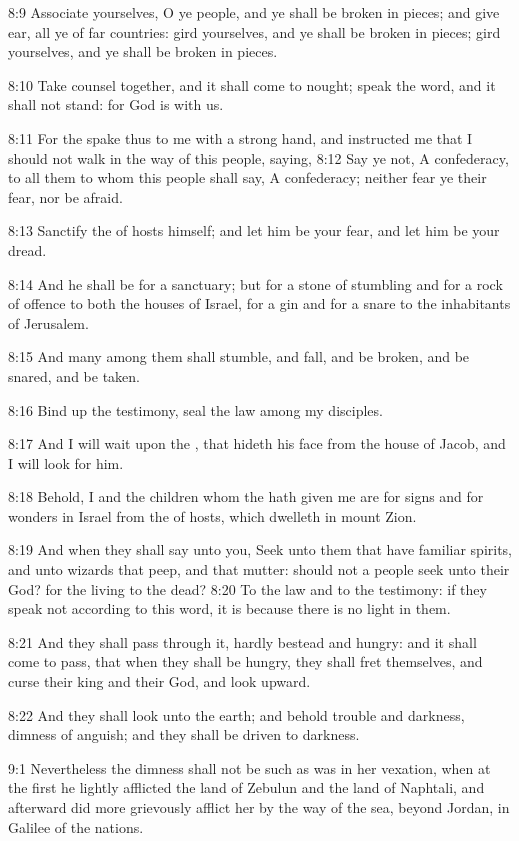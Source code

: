 8:9 Associate yourselves, O ye people, and ye shall be broken in
pieces; and give ear, all ye of far countries: gird yourselves, and ye
shall be broken in pieces; gird yourselves, and ye shall be broken in
pieces.

8:10 Take counsel together, and it shall come to nought; speak the
word, and it shall not stand: for God is with us.

8:11 For the \LORD spake thus to me with a strong hand, and instructed
me that I should not walk in the way of this people, saying, 8:12 Say
ye not, A confederacy, to all them to whom this people shall say, A
confederacy; neither fear ye their fear, nor be afraid.

8:13 Sanctify the \LORD of hosts himself; and let him be your fear, and
let him be your dread.

8:14 And he shall be for a sanctuary; but for a stone of stumbling and
for a rock of offence to both the houses of Israel, for a gin and for
a snare to the inhabitants of Jerusalem.

8:15 And many among them shall stumble, and fall, and be broken, and
be snared, and be taken.

8:16 Bind up the testimony, seal the law among my disciples.

8:17 And I will wait upon the \LORD, that hideth his face from the
house of Jacob, and I will look for him.

8:18 Behold, I and the children whom the \LORD hath given me are for
signs and for wonders in Israel from the \LORD of hosts, which dwelleth
in mount Zion.

8:19 And when they shall say unto you, Seek unto them that have
familiar spirits, and unto wizards that peep, and that mutter: should
not a people seek unto their God? for the living to the dead?  8:20 To
the law and to the testimony: if they speak not according to this
word, it is because there is no light in them.

8:21 And they shall pass through it, hardly bestead and hungry: and it
shall come to pass, that when they shall be hungry, they shall fret
themselves, and curse their king and their God, and look upward.

8:22 And they shall look unto the earth; and behold trouble and
darkness, dimness of anguish; and they shall be driven to darkness.

9:1 Nevertheless the dimness shall not be such as was in her vexation,
when at the first he lightly afflicted the land of Zebulun and the
land of Naphtali, and afterward did more grievously afflict her by the
way of the sea, beyond Jordan, in Galilee of the nations.

